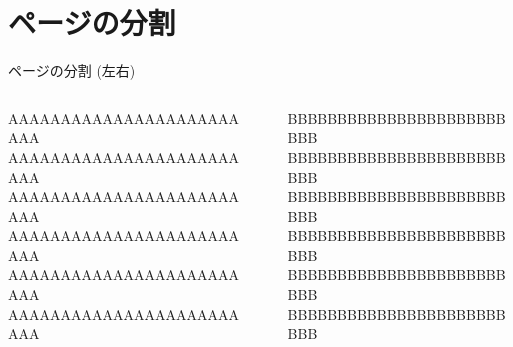 \documentclass[aspectratio=169]{beamer}
\begin{document}
\section{ページの分割}
\begin{frame}{ページの分割 (左右)}
    \begin{columns}
        \begin{column}{0.49\textwidth}
            \centering
            AAAAAAAAAAAAAAAAAAAAAAAAA
            AAAAAAAAAAAAAAAAAAAAAAAAA
            AAAAAAAAAAAAAAAAAAAAAAAAA
            AAAAAAAAAAAAAAAAAAAAAAAAA
            AAAAAAAAAAAAAAAAAAAAAAAAA
            AAAAAAAAAAAAAAAAAAAAAAAAA
        \end{column}
        \begin{column}{.02\textwidth}
            \rule{.1mm}{0.7\textheight}
        \end{column}
        \begin{column}{0.49\textwidth}
            \centering
            BBBBBBBBBBBBBBBBBBBBBBBBB
            BBBBBBBBBBBBBBBBBBBBBBBBB
            BBBBBBBBBBBBBBBBBBBBBBBBB
            BBBBBBBBBBBBBBBBBBBBBBBBB
            BBBBBBBBBBBBBBBBBBBBBBBBB
            BBBBBBBBBBBBBBBBBBBBBBBBB
        \end{column}
    \end{columns}
\end{frame}
\end{document}

